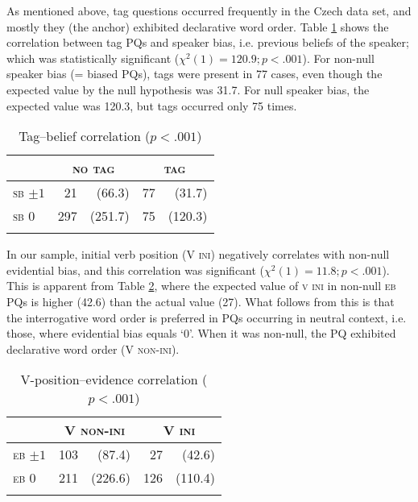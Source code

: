 \documentclass[output=paper,colorlinks,citecolor=brown]{langscibook}
\begin{document}
As mentioned above, tag questions occurred frequently in the Czech data set, and mostly they (the anchor) exhibited declarative word order. Table \ref{tab-cz-tag} shows the correlation between tag PQs and speaker bias, i.e. previous beliefs of the speaker; which was statistically significant ($\chi^2(1)=120.9; p<.001$). For non-null speaker bias (= biased PQs), tags were present in 77 cases, even though the expected value by the null hypothesis was 31.7. For null speaker bias, the expected value was 120.3, but tags occurred only 75 times. 


\begin{table}
\caption{Tag--belief correlation ($p<.001$)}
\label{tab-cz-tag}
 \begin{tabularx}{.5\textwidth}{lrrrr} %
  \lsptoprule
            & \multicolumn{2}{c}{\textsc{no tag}} & \multicolumn{2}{c}{\textsc{tag}} \\
  \midrule
  \textsc{sb $\pm 1$}   &21 & (66.3)     &77 & (31.7) \\
  \textsc{sb 0}         &297&  (251.7)   &75 & (120.3) \\
  \lspbottomrule
 \end{tabularx}
\end{table}

In our sample, initial verb position (\textsc{V ini}) negatively correlates with non-null evidential bias, and this correlation was significant ($\chi^2(1)=11.8; p<.001$). This is apparent from Table \ref{tab-cz-verb}, where the expected value of \textsc{v ini} in non-null \textsc{eb} PQs is higher (42.6) than the actual value (27). What follows from this is that the interrogative word order is preferred in PQs occurring in neutral context, i.e. those, where evidential bias equals `0'. When it was non-null, the PQ exhibited declarative word order (\textsc{V non-ini}).

\begin{table}
\caption{V-position--evidence correlation ($p<.001$)}
\label{tab-cz-verb}
 \begin{tabularx}{.5\textwidth}{lrrrr} %
  \lsptoprule
            & \multicolumn{2}{c}{\textsc{V non-ini}} & \multicolumn{2}{c}{\textsc{V ini}} \\
  \midrule
  \textsc{eb $\pm 1$}   &103 &(87.4)     &27 &(42.6) \\
  \textsc{eb 0}         &211 &(226.6)    &126& (110.4) \\
  \lspbottomrule
 \end{tabularx}
\end{table}
\end{document}

